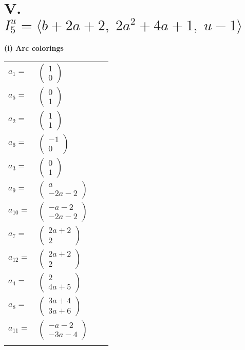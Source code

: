\documentclass[1p]{elsarticle_modified}
\theoremstyle{definition}
\begin{document}
\centering \section*{V. $I^u_{5}= \langle b+2 a+2,\;2 a^2+4 a+1,\;u-1 \rangle$}
\flushleft \textbf{(i) Arc colorings}\\
\begin{tabular}{m{7pt} m{180pt} m{7pt} m{180pt} }
\flushright $a_{1}=$&$\begin{pmatrix}1\\0\end{pmatrix}$ \\
\flushright $a_{5}=$&$\begin{pmatrix}0\\1\end{pmatrix}$ \\
\flushright $a_{2}=$&$\begin{pmatrix}1\\1\end{pmatrix}$ \\
\flushright $a_{6}=$&$\begin{pmatrix}-1\\0\end{pmatrix}$ \\
\flushright $a_{3}=$&$\begin{pmatrix}0\\1\end{pmatrix}$ \\
\flushright $a_{9}=$&$\begin{pmatrix}a\\-2 a-2\end{pmatrix}$ \\
\flushright $a_{10}=$&$\begin{pmatrix}- a-2\\-2 a-2\end{pmatrix}$ \\
\flushright $a_{7}=$&$\begin{pmatrix}2 a+2\\2\end{pmatrix}$ \\
\flushright $a_{12}=$&$\begin{pmatrix}2 a+2\\2\end{pmatrix}$ \\
\flushright $a_{4}=$&$\begin{pmatrix}2\\4 a+5\end{pmatrix}$ \\
\flushright $a_{8}=$&$\begin{pmatrix}3 a+4\\3 a+6\end{pmatrix}$ \\
\flushright $a_{11}=$&$\begin{pmatrix}- a-2\\-3 a-4\end{pmatrix}$\\&\end{tabular}
\end{document}
